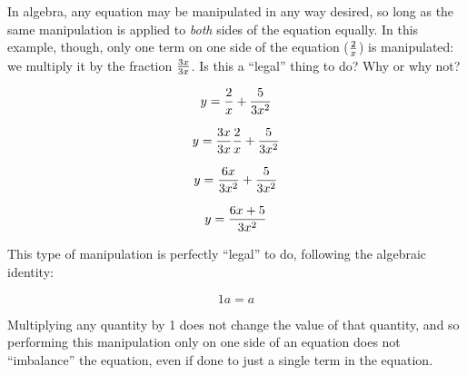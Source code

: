 

In algebra, any equation may be manipulated in any way desired, so long as the same manipulation is applied to {\it both} sides of the equation equally.  In this example, though, only one term on one side of the equation (${2 \over x}$) is manipulated: we multiply it by the fraction ${3x \over 3x}$.  Is this a ``legal'' thing to do?  Why or why not?

$$y = {2 \over x} + {5 \over 3x^2}$$

$$y = {3x \over 3x}{2 \over x} + {5 \over 3x^2}$$

$$y = {6x \over 3x^2} + {5 \over 3x^2}$$

$$y = {{6x + 5} \over 3x^2}$$







This type of manipulation is perfectly ``legal'' to do, following the algebraic identity:

$$1a = a$$







Multiplying any quantity by 1 does not change the value of that quantity, and so performing this manipulation only on one side of an equation does not ``imbalance'' the equation, even if done to just a single term in the equation.




